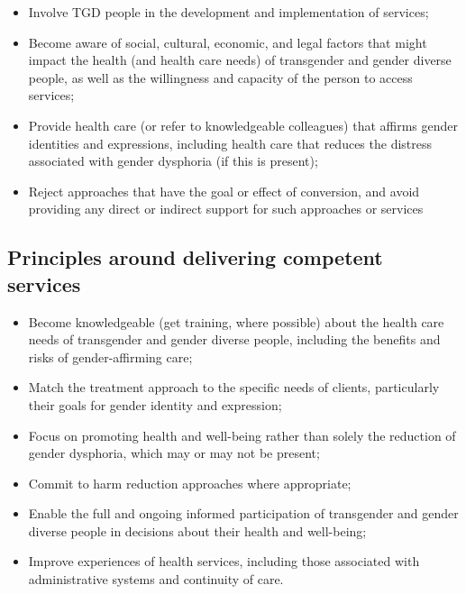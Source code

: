 \documentclass[
]{book}
\providecommand{\tightlist}{%
  \setlength{\itemsep}{0pt}\setlength{\parskip}{0pt}}
\begin{document}
\begin{itemize}
\tightlist
\item
  Involve TGD people in the development
  and implementation of services;
\item
  Become aware of social, cultural, economic,
  and legal factors that might impact the
  health (and health care needs) of transgender and gender diverse people, as well as
  the willingness and capacity of the person
  to access services;
\item
  Provide health care (or refer to knowledgeable colleagues) that affirms gender identities and expressions, including health care
  that reduces the distress associated with
  gender dysphoria (if this is present);
\item
  Reject approaches that have the goal or
  effect of conversion, and avoid providing
  any direct or indirect support for such
  approaches or services
\end{itemize}

\hypertarget{principles-around-delivering-competent-services}{%
\subsection*{Principles around delivering competent services}\label{principles-around-delivering-competent-services}}

\begin{itemize}
\tightlist
\item
  Become knowledgeable (get training, where
  possible) about the health care needs of
  transgender and gender diverse people, including the benefits and risks of
  gender-affirming care;
\item
  Match the treatment approach to the specific needs of clients, particularly their
  goals for gender identity and expression;
\item
  Focus on promoting health and well-being
  rather than solely the reduction of gender dysphoria, which may or may not be
  present;
\item
  Commit to harm reduction approaches
  where appropriate;
\item
  Enable the full and ongoing informed participation of transgender and gender diverse
  people in decisions about their health and
  well-being;
\item
  Improve experiences of health services,
  including those associated with administrative systems and continuity of care.
\end{itemize}
\end{document}
